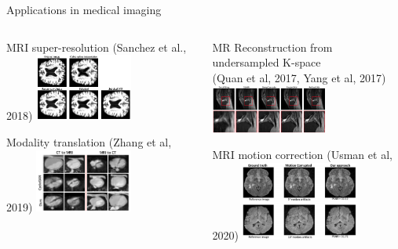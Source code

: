 \documentclass[8pt,xcolor=table,aspectratio=169]{beamer}
\begin{document}
\begin{frame}{Applications in medical imaging}

\begin{columns}
\begin{column}{0.5\textwidth}
\centering
MRI super-resolution (Sanchez et al., 2018)
\includegraphics[width=0.5\textwidth]{X6IAL27.png}

\vspace{2em}

Modality translation (Zhang et al, 2019)
\includegraphics[width=0.5\textwidth]{bJiu3sB.png}


\end{column}
\begin{column}{0.5\textwidth}
\centering
MR Reconstruction from undersampled K-space\\
(Quan et al, 2017, Yang et al, 2017)
\includegraphics[width=0.6\textwidth]{FGjJDse.png}

\vspace{2em}

MRI motion correction (Usman et al, 2020)
\includegraphics[width=0.6\textwidth]{enijS65.png}



\end{column}
\end{columns}
\end{frame}
\end{document}
